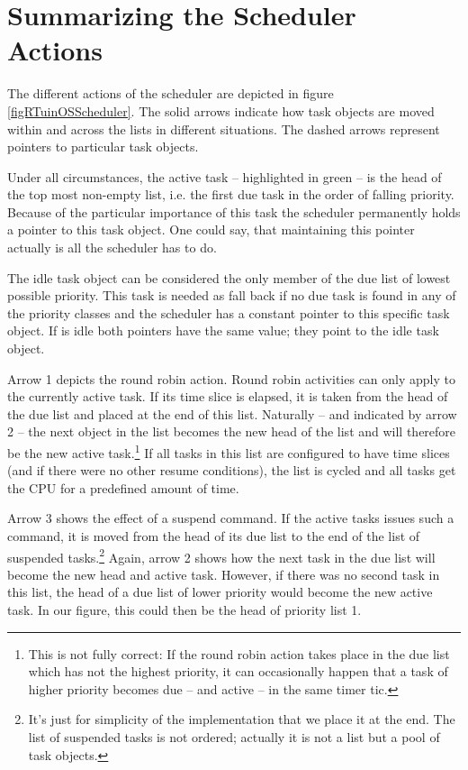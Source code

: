 \section{Summarizing the Scheduler Actions}


The different actions of the scheduler are depicted in figure
\ref{figRTuinOSScheduler}. The solid arrows indicate how task objects are
moved within and across the lists in different situations. The dashed
arrows represent pointers to particular task objects.

Under all circumstances, the active task -- highlighted in green -- is the
head of the top most non-empty list, i.e. the first due task in the order
of falling priority. Because of the particular importance of this task the
scheduler permanently holds a pointer to this task object. One could say,
that maintaining this pointer actually is all the scheduler has to do.

The idle task object can be considered the only member of the due list of
lowest possible priority. This task is needed as fall back if no due task
is found in any of the priority classes and the scheduler has a constant
pointer to this specific task object. If \rtos{} is idle both pointers have
the same value; they point to the idle task object.

Arrow 1 depicts the round robin action. Round robin activities can only
apply to the currently active task. If its time slice is elapsed, it is
taken from the head of the due list and placed at the end of this list.
Naturally -- and indicated by arrow 2 -- the next object in the list
becomes the new head of the list and will therefore be the new active
task.\footnote{This is not fully correct: If the round robin action takes
place in the due list which has not the highest priority, it can
occasionally happen that a task of higher priority becomes due -- and
active -- in the same timer tic.} If all tasks in this list are configured
to have time slices (and if there were no other resume conditions), the
list is cycled and all tasks get the CPU for a predefined amount of time.

Arrow 3 shows the effect of a suspend command. If the active tasks issues
such a command, it is moved from the head of its due list to the end of
the list of suspended tasks.\footnote{It's just for simplicity of the
implementation that we place it at the end. The list of suspended tasks is
not ordered; actually it is not a list but a pool of task objects.} Again,
arrow 2 shows how the next task in the due list will become the new head
and active task. However, if there was no second task in this list, the
head of a due list of lower priority would become the new active task. In
our figure, this could then be the head of priority list 1.

